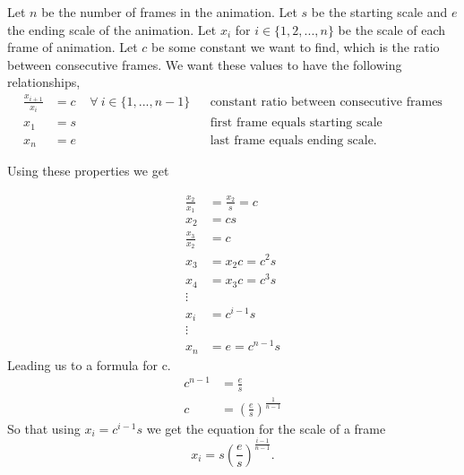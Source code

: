 \documentclass[preview]{standalone}
\begin{document}
Let $n$ be the number of frames in the animation.
Let $s$ be the starting scale and $e$ the ending scale of the
animation.
Let $x_i$ for $i \in \{ 1, 2, ... , n \} $ be the scale of each frame
of animation. Let $c$ be some constant we want to find, which is the
ratio between consecutive frames.
We want these values to have the following relationships,
\begin{align*}
   \frac{x_{i+1}}{x_i} & = c \; \; \; \; \forall \: i \in \{ 1, ..., n -
   1 \} && \mbox{constant ratio between consecutive frames} \\
   x_1 & = s  && \mbox{first frame equals starting scale} \\
  x_n & = e && \mbox{last frame equals ending scale}
.\end{align*}

Using these properties we get

\begin{align*}
  \frac{x_2}{x_1} & = \frac{x_2}{s} =  c \\
  x_2 & = c s \\
  \frac{x_3}{x_2} & = c \\
  x_3 & = x_2 c = c^2 s \\
  x_4 & = x_3 c = c^3 s \\
                  \vdots \\
  x_i & = c^{i-1} s \\
                  \vdots \\
  x_{n} & = e = c^{n-1} s
\end{align*}
Leading us to a formula for c.
\begin{align*}
  c^{n-1} &= \frac{e}{s} \\
  c &= \left( \frac{e}{s} \right) ^{\frac{1}{n-1}}
\end{align*}
So that using $x_i = c^{i-1} s$ we get the equation for the scale of a
frame
\[
  x_i = s \left( \frac{e}{s} \right)^{\frac{i - 1}{n - 1}}
.\]
\end{document}
